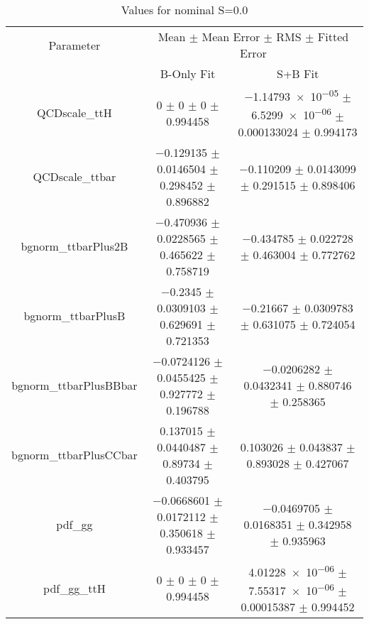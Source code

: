 \begin{table}
\centering
\caption{Values for nominal S=0.0}
\begin{tabular}{ccc}
\toprule
Parameter & \multicolumn{2}{c}{Mean $\pm$ Mean Error $\pm$ RMS $\pm$ Fitted Error}\\
 & B-Only Fit & S+B Fit\\
\midrule
QCDscale\_ttH & \num{0} $\pm$ \num{0} $\pm$ \num{0} $\pm$ \num{0.994458} & \num{-1.14793e-05} $\pm$ \num{6.5299e-06} $\pm$ \num{0.000133024} $\pm$ \num{0.994173}\\
QCDscale\_ttbar & \num{-0.129135} $\pm$ \num{0.0146504} $\pm$ \num{0.298452} $\pm$ \num{0.896882} & \num{-0.110209} $\pm$ \num{0.0143099} $\pm$ \num{0.291515} $\pm$ \num{0.898406}\\
bgnorm\_ttbarPlus2B & \num{-0.470936} $\pm$ \num{0.0228565} $\pm$ \num{0.465622} $\pm$ \num{0.758719} & \num{-0.434785} $\pm$ \num{0.022728} $\pm$ \num{0.463004} $\pm$ \num{0.772762}\\
bgnorm\_ttbarPlusB & \num{-0.2345} $\pm$ \num{0.0309103} $\pm$ \num{0.629691} $\pm$ \num{0.721353} & \num{-0.21667} $\pm$ \num{0.0309783} $\pm$ \num{0.631075} $\pm$ \num{0.724054}\\
bgnorm\_ttbarPlusBBbar & \num{-0.0724126} $\pm$ \num{0.0455425} $\pm$ \num{0.927772} $\pm$ \num{0.196788} & \num{-0.0206282} $\pm$ \num{0.0432341} $\pm$ \num{0.880746} $\pm$ \num{0.258365}\\
bgnorm\_ttbarPlusCCbar & \num{0.137015} $\pm$ \num{0.0440487} $\pm$ \num{0.89734} $\pm$ \num{0.403795} & \num{0.103026} $\pm$ \num{0.043837} $\pm$ \num{0.893028} $\pm$ \num{0.427067}\\
pdf\_gg & \num{-0.0668601} $\pm$ \num{0.0172112} $\pm$ \num{0.350618} $\pm$ \num{0.933457} & \num{-0.0469705} $\pm$ \num{0.0168351} $\pm$ \num{0.342958} $\pm$ \num{0.935963}\\
pdf\_gg\_ttH & \num{0} $\pm$ \num{0} $\pm$ \num{0} $\pm$ \num{0.994458} & \num{4.01228e-06} $\pm$ \num{7.55317e-06} $\pm$ \num{0.00015387} $\pm$ \num{0.994452}\\
\bottomrule
\end{tabular}
\end{table}